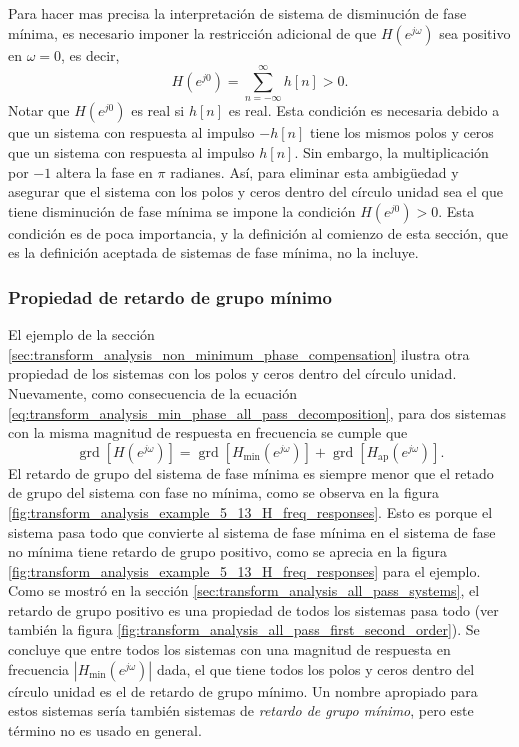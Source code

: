 \documentclass[a4paper]{report}
\DeclareMathOperator{\grd}{grd}
\begin{document}
Para hacer mas precisa la interpretación de sistema de disminución de fase mínima, es necesario imponer la restricción adicional de que \(H(e^{j\omega})\) sea positivo en \(\omega=0\), es decir,
\[
 H(e^{j0})=\sum_{n=-\infty}^\infty h[n]>0.
\]
Notar que \(H(e^{j0})\) es real si \(h[n]\) es real. Esta condición es necesaria debido a que un sistema con respuesta al impulso \(-h[n]\) tiene los mismos polos y ceros que un sistema con respuesta al impulso \(h[n]\). Sin embargo, la multiplicación por \(-1\) altera la fase en \(\pi\) radianes. Así, para eliminar esta ambigüedad y asegurar que el sistema con los polos y ceros dentro del círculo unidad sea el que tiene disminución de fase mínima se impone la condición \(H(e^{j0})>0\). Esta condición es de poca importancia, y la definición al comienzo de esta sección, que es la definición aceptada de sistemas de fase mínima, no la incluye.

\subsubsection{Propiedad de retardo de grupo mínimo} 

El ejemplo de la sección \ref{sec:transform_analysis_non_minimum_phase_compensation} ilustra otra propiedad de los sistemas con los polos y ceros dentro del círculo unidad. Nuevamente, como consecuencia de la ecuación  \ref{eq:transform_analysis_min_phase_all_pass_decomposition}, para dos sistemas con la misma magnitud de respuesta en frecuencia se cumple que 
\[
 \grd[H(e^{j\omega})]=\grd[H_\textrm{min}(e^{j\omega})]+\grd[H_\textrm{ap}(e^{j\omega})].
\]
El retardo de grupo del sistema de fase mínima es siempre menor que el retado de grupo del sistema con fase no mínima, como se observa en la figura \ref{fig:transform_analysis_example_5_13_H_freq_responses}. Esto es porque el sistema pasa todo que convierte al sistema de fase mínima en el sistema de fase no mínima tiene retardo de grupo positivo, como se aprecia en la figura \ref{fig:transform_analysis_example_5_13_H_freq_responses} para el ejemplo. Como se mostró en la sección \ref{sec:transform_analysis_all_pass_systems}, el retardo de grupo positivo es una propiedad de todos los sistemas pasa todo (ver también la figura \ref{fig:transform_analysis_all_pass_first_second_order}). Se concluye que entre todos los sistemas con una magnitud de respuesta en frecuencia \(|H_\textrm{min}(e^{j\omega})|\) dada, el que tiene todos los polos y ceros dentro del círculo unidad es el de retardo de grupo mínimo. Un nombre apropiado para estos sistemas sería también sistemas de \emph{retardo de grupo mínimo}, pero este término no es usado en general.
\end{document}
